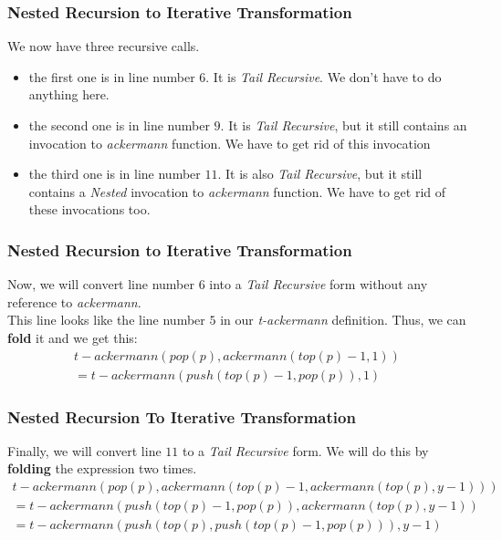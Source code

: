 \documentclass{beamer}
\begin{document}
\begin{frame}
	\frametitle{Nested Recursion to Iterative Transformation}
	We now have three recursive calls.
	\begin{itemize}
		\item the first one is in line number $6$. It is \textit{Tail Recursive}. We don't have to do anything here.
		\item the second one is in line number $9$. It is \textit{Tail Recursive}, but it still contains an invocation to \textit{ackermann} function. We have to get rid of this invocation
		\item the third one is in line number $11$. It is also \textit{Tail Recursive}, but it still contains a \textit{Nested} invocation to \textit{ackermann} function. We have to get rid of these invocations too.
	\end{itemize}
\end{frame}
\begin{frame}
	\frametitle{Nested Recursion to Iterative Transformation}
	Now, we will convert line number $6$ into a \textit{Tail Recursive} form without any reference to \textit{ackermann}.\\ This line looks like the line number $5$ in our \textit{t-ackermann} definition. Thus, we can \textbf{fold} it and we get this:
	\begin{equation}
		\begin{split}
		t-ackermann(pop(p),ackermann(top(p)-1,1)) \\ = t-ackermann(push(top(p)-1,pop(p)),1)
		\end{split}
	\end{equation}

\end{frame}
\begin{frame}
	\frametitle{Nested Recursion To Iterative Transformation} 
	Finally, we will convert line $11$ to a \textit{Tail Recursive} form. We will do this by \textbf{folding} the expression two times.
	\begin{equation}
		\begin{split}
			t-ackermann(pop(p),ackermann(top(p)-1,ackermann(top(p),y-1))) \\ =
			t-ackermann(push(top(p)-1,pop(p)),ackermann(top(p),y-1))\\  = 
			t-ackermann(push(top(p),push(top(p)-1,pop(p))), y-1)
		\end{split}
	\end{equation}
\end{frame}
\end{document}
